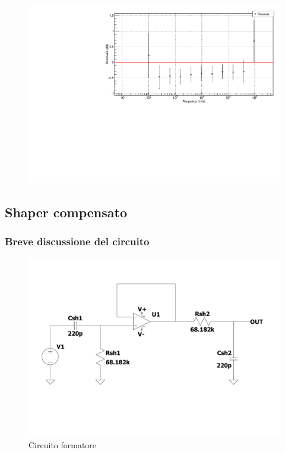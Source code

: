\documentclass{article}
\begin{document}
\begin{center}
    \begin{figure}[H]
    \centering
    \includegraphics[scale=0.3875, angle=0]{bodeshaperresidui_no_pz.pdf}
    \caption{ }
    \label{fig:bodeshaperresidui_no_pz}
    \end{figure}
\end{center}

\subsection{Shaper compensato}
\subsubsection{Breve discussione del circuito}

\begin{center}
    \begin{figure}[H]
    \centering
    \includegraphics[scale=0.1875, angle=0]{shaper.pdf}
    \caption{Circuito formatore}
    \label{fig:shaper}
    \end{figure}
\end{center}
\end{document}
